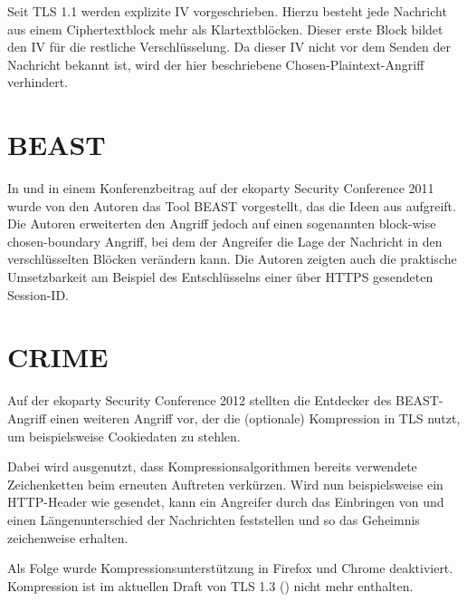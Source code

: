 Seit TLS 1.1 werden explizite IV vorgeschrieben. Hierzu besteht jede Nachricht aus einem Ciphertextblock mehr als Klartextblöcken. Dieser erste Block bildet den IV für die restliche Verschlüsselung. Da dieser IV nicht vor dem Senden der Nachricht bekannt ist, wird der hier beschriebene Chosen-Plaintext-Angriff verhindert.

\section{BEAST}

In \cite{duong11} und in einem Konferenzbeitrag auf der ekoparty Security Conference 2011 wurde von den Autoren das Tool BEAST vorgestellt, das die Ideen aus \cite{bard04} aufgreift. Die Autoren erweiterten den Angriff jedoch auf einen sogenannten block-wise chosen-boundary Angriff, bei dem der Angreifer die Lage der Nachricht in den verschlüsselten Blöcken verändern kann. Die Autoren zeigten auch die praktische Umsetzbarkeit am Beispiel des Entschlüsselns einer über HTTPS gesendeten Session-ID.


\section{CRIME}

\label{sec_attack_crime}

Auf der ekoparty Security Conference 2012 stellten die Entdecker des BEAST-Angriff einen weiteren Angriff vor, der die (optionale) Kompression in TLS nutzt, um beispielsweise Cookiedaten zu stehlen. 

Dabei wird ausgenutzt, dass Kompressionsalgorithmen bereits verwendete Zeichenketten beim erneuten Auftreten verkürzen. Wird nun beispielsweise ein HTTP-Header wie  gesendet, kann ein Angreifer durch das Einbringen von  und  einen Längenunterschied der Nachrichten feststellen und so das Geheimnis zeichenweise erhalten.

Als Folge wurde Kompressionsunterstützung in Firefox und Chrome deaktiviert. Kompression ist im aktuellen Draft von TLS 1.3 (\cite{tls13}) nicht mehr enthalten.

